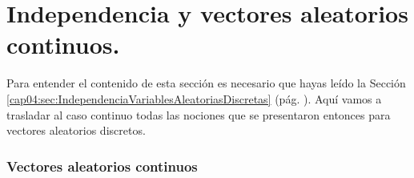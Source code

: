 \section{Independencia y vectores aleatorios continuos.}
\label{cap05:sec:VectoresAleatoriosContinuos}

Para entender el contenido de esta sección es necesario que hayas leído la Sección \ref{cap04:sec:IndependenciaVariablesAleatoriasDiscretas} (pág. \pageref{cap04:sec:IndependenciaVariablesAleatoriasDiscretas}). Aquí vamos a trasladar al caso continuo todas las nociones que se presentaron entonces para vectores aleatorios discretos.

\subsubsection{Vectores aleatorios continuos}

